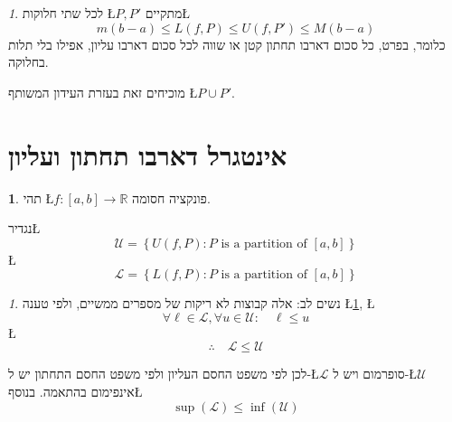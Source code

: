 \documentclass[english,hebrew]{article}
\theoremstyle{remark}
\theoremstyle{definition}
\newtheorem*{defn*}{\protect\definitionname}
\theoremstyle{plain}
\theoremstyle{remark}
\newtheorem{claim}[thm]{\protect\claimname}
\theoremstyle{plain}
\theoremstyle{plain}
\theoremstyle{definition}
\theoremstyle{plain}
\providecommand{\claimname}{טענה}
\providecommand{\definitionname}{הגדרה}
\begin{document}
\begin{claim}
\label{claim:two-partitions}לכל שתי חלוקות \L{$P,P'$} מתקיים\L{%
\[
m\left(b-a\right)\le L\left(f,P\right)\le U\left(f,P'\right)\le M\left(b-a\right)
\]
}%
כלומר, בפרט, כל סכום דארבו תחתון קטן או שווה לכל סכום דארבו עליון,
אפילו בלי תלות בחלוקה.

מוכיחים זאת בעזרת העידון המשותף \L{$P\cup P'$}.
\end{claim}

\section{אינטגרל דארבו תחתון ועליון}
\begin{defn*}
תהי \L{$f:\left[a,b\right]\rightarrow\mathbb{R}$} פונקציה חסומה.

נגדיר\L{%
\[
\mathcal{U}=\left\{ U\left(f,P\right):P\text{ is a partition of }\left[a,b\right]\right\} 
\]
}%
\L{%
\[
\mathcal{L}=\left\{ L\left(f,P\right):P\text{ is a partition of }\left[a,b\right]\right\} 
\]
}%
\end{defn*}
\begin{claim}
נשים לב: אלה קבוצות לא ריקות של מספרים ממשיים, ולפי טענה \L{\ref{claim:two-partitions}},
\L{%
\[
\forall\ell\in\mathcal{L},\forall u\in\mathcal{U}:\quad\ell\le u
\]
}%
\L{%
\[
\therefore\quad\mathcal{L}\le\mathcal{U}
\]
}%

לכן לפי משפט החסם העליון ולפי משפט החסם התחתון יש ל-\L{$\mathcal{L}$}
סופרמום ויש ל-\L{$\mathcal{U}$} אינפימום בהתאמה. בנוסף\L{%
\[
\sup\left(\mathcal{L}\right)\le\inf\left(\mathcal{U}\right)
\]
}%
\end{claim}
\end{document}
